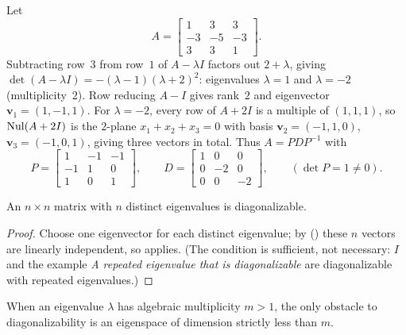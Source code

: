 \documentclass[10pt]{scrartcl}
\newcommand{\vv}[1]{\mathbf{#1}}
\begin{document}
\begin{example*}
  Let
  \[
    A = \begin{bmatrix}1&3&3\\-3&-5&-3\\3&3&1\end{bmatrix}.
  \]
  Subtracting row~$3$ from row~$1$ of $A-\lambda I$ factors out $2+\lambda$, giving $\det(A-\lambda I)=-(\lambda-1)(\lambda+2)^2$: eigenvalues $\lambda=1$ and $\lambda=-2$ (multiplicity~$2$). Row reducing $A-I$ gives rank~$2$ and eigenvector $\vv v_1=(1,-1,1)$. For $\lambda=-2$, every row of $A+2I$ is a multiple of $(1,1,1)$, so $\operatorname{Nul}(A+2I)$ is the $2$-plane $x_1+x_2+x_3=0$ with basis $\vv v_2=(-1,1,0)$, $\vv v_3=(-1,0,1)$, giving three vectors in total. Thus $A=PDP^{-1}$ with
  \[
    P = \begin{bmatrix}1&-1&-1\\-1&1&0\\1&0&1\end{bmatrix}, \qquad
    D = \begin{bmatrix}1&0&0\\0&-2&0\\0&0&-2\end{bmatrix}, \qquad (\det P=1\ne 0).
  \]
\end{example*}

\begin{theorem*}
  An $n\times n$ matrix with $n$ distinct eigenvalues is diagonalizable.
\end{theorem*}
\begin{proof}
  Choose one eigenvector for each distinct eigenvalue; by  () these $n$ vectors are linearly independent, so  applies. (The condition is sufficient, not necessary: $I$ and the example \emph{A repeated eigenvalue that is diagonalizable} are diagonalizable with repeated eigenvalues.)
\end{proof}

When an eigenvalue $\lambda$ has algebraic multiplicity $m>1$, the only obstacle to diagonalizability is an eigenspace of dimension strictly less than $m$.
\end{document}
